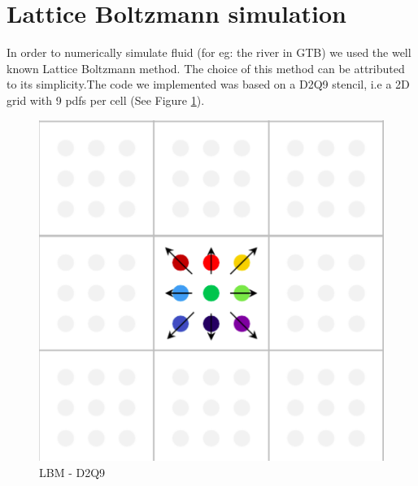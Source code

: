 \section{Lattice Boltzmann simulation}
In order to numerically simulate fluid (for eg: the river in GTB) we used the well known Lattice Boltzmann method. The choice
of this method can be attributed to its simplicity.The code we implemented was based on a D2Q9 stencil, i.e a 2D grid with 9 pdfs per cell (See Figure \ref{fig: D2Q9 push scheme}). 

	
\begin{figure} [h]
\centering
\includegraphics[scale=0.4]{img/LBM/D2Q9_push}
\caption{LBM - D2Q9}
\label{fig: D2Q9 push scheme}
\end{figure}


